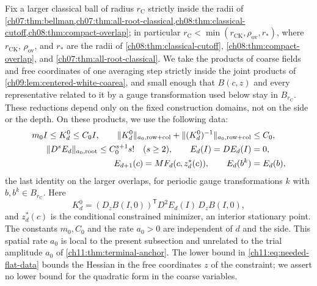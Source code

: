 Fix a larger classical ball of radius $r_{\mathrm C}$ strictly inside the radii of \cref{ch07:thm:bellman,ch07:thm:all-root-classical,ch08:thm:classical-cutoff,ch08:thm:compact-overlap}; in particular $r_{\mathrm C}<\min(r_{\mathrm{CK}},\rho_{\mathrm{ov}},r_*)$, where $r_{\mathrm{CK}}$, $\rho_{\mathrm{ov}}$, and $r_*$ are the radii of \cref{ch08:thm:classical-cutoff}, \cref{ch08:thm:compact-overlap}, and \cref{ch07:thm:all-root-classical}. We take the products of coarse fields and free coordinates of one averaging step strictly inside the joint products of \cref{ch09:lem:centered-white-coarea}, and small enough that $B(c,z)$ and every representative related to it by a gauge transformation used below stay in $B_{r_{\mathrm C}}$. These reductions depend only on the fixed construction domains, not on the side or the depth. On these products, we use the following data:
\begin{align}
 m_0I\le K_d^0\le C_0I,\qquad
 \lVert K_d^0\rVert_{a_0,\mathrm{row+col}}+\lVert (K_d^0)^{-1}\rVert_{a_0,\mathrm{row+col}}&\le C_0,
 \label{ch11:eq:needed-flat-data}\\
 \lVert D^sE_d\rVert_{a_0,\mathrm{root}}\le C_0^{s+1}s!\quad(s\ge2),\qquad E_d(I)=DE_d(I)&=0,
 \label{ch11:eq:needed-classical-jets}\\
 E_{d+1}(c)=MF_d(c,z_d^*(c)),\qquad E_d(b^k)&=E_d(b),
 \label{ch11:eq:needed-bellman}
\end{align}
the last identity on the larger overlaps, for periodic gauge transformations $k$ with $b,b^k\in B_{r_{\mathrm C}}$. Here
\[
 K_d^0=(D_zB(I,0))^{\mathsf T}D^2E_d(I)\,D_zB(I,0),
\]
and $z_d^*(c)$ is the conditional constrained minimizer, an interior stationary point. The constants $m_0,C_0$ and the rate $a_0>0$ are independent of $d$ and the side. This spatial rate $a_0$ is local to the present subsection and unrelated to the trial amplitude $a_0$ of \cref{ch11:thm:terminal-anchor}. The lower bound in \eqref{ch11:eq:needed-flat-data} bounds the Hessian in the free coordinates $z$ of the constraint; we assert no lower bound for the quadratic form in the coarse variables.

